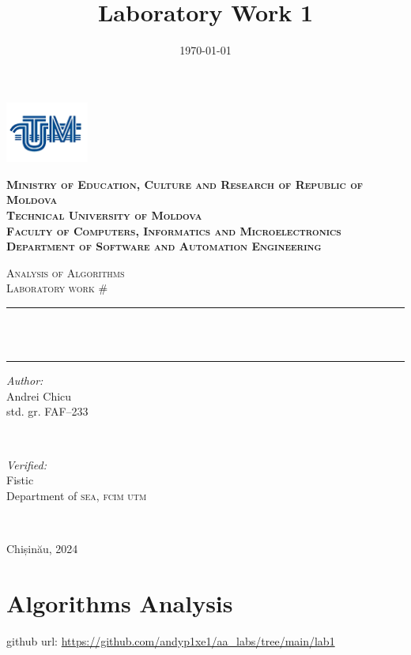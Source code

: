 \documentclass[a4paper,12pt]{article}
\date{\today}
\title{Laboratory Work 1}
\begin{document}
\begin{titlepage}
\centering

\includegraphics[height=2cm]{utm_logo.png}

\bfseries
\textsc{Ministry of Education, Culture and Research of Republic of Moldova} \\
\textsc{Technical University of Moldova} \\
\textsc{Faculty of Computers, Informatics and Microelectronics} \\
\textsc{Department of Software and Automation Engineering} \\
\mdseries

\vfill

\textsc{\Large Analysis of Algorithms} \\
\textsc{\large Laboratory work \#\Num}\\[0.5cm]

\vspace{12pt}
\newcommand{\HRule}{\rule{\linewidth}{0.5mm}}
\HRule \\[0.2cm]
{ \LARGE \bfseries \Topic }\\[0.4cm]
\HRule
\vfill

\begin{minipage}[t]{0.4\textwidth}
\begin{flushleft} \large
\emph{Author:} \\
Andrei Chicu\\                        
std. gr. FAF--233
\end{flushleft}
\end{minipage}
~
\begin{minipage}[t]{0.4\textwidth}
\raggedleft \large
\emph{Verified:} \\
Fistic \\
Department of \textsc{sea, fcim utm}
\end{minipage}\\[3cm]
\vfill

Chișinău, 2024
\end{titlepage}
\setcounter{page}{2}
\section{Algorithms Analysis}
\label{sec:org6e812aa}
github url: \url{https://github.com/andyp1xe1/aa_labs/tree/main/lab1}
\end{document}
